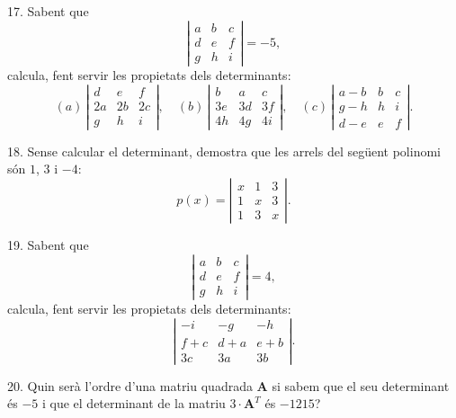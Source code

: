 \documentclass[12pt]{article}
\newcommand{\mat}[1]{\mathbf{#1}}
\begin{document}
\begin{exercici}
17. Sabent que
\[
\left| \begin{matrix} a & b & c \\ d & e & f \\ g & h & i \end{matrix} \right| = -5,
\]
calcula, fent servir les propietats dels determinants:
\[
(a) \, \left| \begin{matrix} d & e & f \\ 2a & 2b & 2c \\ g & h & i \end{matrix} \right|, \quad 
(b) \, \left| \begin{matrix} b & a & c \\ 3e & 3d & 3f \\ 4h & 4g & 4i \end{matrix} \right|, \quad 
(c) \, \left| \begin{matrix} a-b & b & c \\ g-h & h & i \\ d-e & e & f \end{matrix} \right|.
\]
\end{exercici}

\begin{exercici}
18. Sense calcular el determinant, demostra que les arrels del següent polinomi són $1$, $3$ i $-4$:
\[
p(x) = \left| \begin{matrix} x & 1 & 3 \\ 1 & x & 3 \\ 1 & 3 & x \end{matrix} \right|.
\]
\end{exercici}

\begin{exercici}
19. Sabent que
\[
\left| \begin{matrix} a & b & c \\ d & e & f \\ g & h & i \end{matrix} \right| = 4,
\]
calcula, fent servir les propietats dels determinants:
\[
\left| \begin{matrix} -i & -g & -h \\ f+c & d+a & e+b \\ 3c & 3a & 3b \end{matrix} \right|.
\]
\end{exercici}

\begin{exercici}
20. Quin serà l'ordre d'una matriu quadrada $\mat{A}$ si sabem que el seu determinant és $-5$ i que el determinant de la matriu $3 \cdot \mat{A}^T$ és $-1215$?
\end{exercici}
\end{document}
